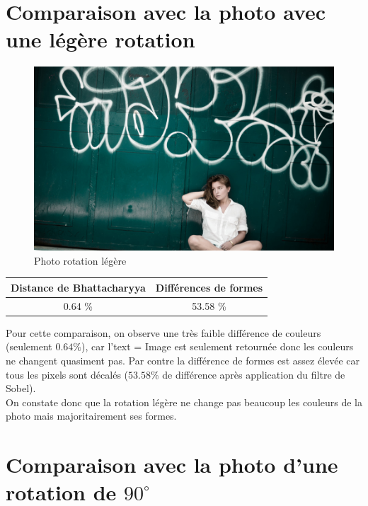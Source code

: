 \documentclass[]{article}
\begin{document}
\begin{description}
\newpage

\section{Comparaison avec la photo avec une légère
rotation}\label{comparaison-avec-la-photo-avec-une-luxe9guxe8re-rotation}

\begin{figure}[htbp]
\centering
\includegraphics{photos/rotate.jpg}
\caption{Photo rotation légère}
\end{figure}

\begin{center}
\begin{tabular}{|c|c|}
  \hline
  Distance de Bhattacharyya & Différences de formes \\
  \hline
  0.64 \% & 53.58 \% \\
  \hline
\end{tabular}
\end{center}


Pour cette comparaison, on observe une très faible différence de
couleurs (seulement $0.64 \%$), car l'text = Image est seulement retournée donc
les couleurs ne changent quasiment pas. Par contre la différence de
formes est assez élevée car tous les pixels sont décalés ($53.58 \%$ de
différence après application du filtre de Sobel).\\On constate donc que
la rotation légère ne change pas beaucoup les couleurs de la photo mais
majoritairement ses formes.

\newpage

\section{Comparaison avec la photo d'une rotation de
$90^{\circ}$}\label{comparaison-avec-la-photo-dune-rotation-de-90circ}


\end{description}
\end{document}
